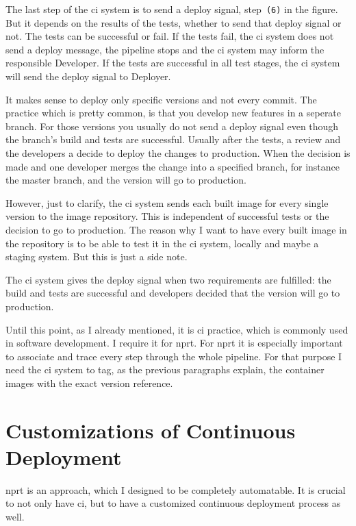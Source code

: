 The last step of the \gls{ci} system is to send a deploy signal, step~\texttt{(6)} in the
figure. But it depends on the results of the tests, whether to send that deploy signal or
not. The tests can be successful or fail. If the tests fail, the \gls{ci} system does not
send a deploy message, the pipeline stops and the \gls{ci} system may inform the
responsible Developer. If the tests are successful in all test stages, the \gls{ci} system
will send the deploy signal to Deployer.

It makes sense to deploy only specific versions and not every commit. The practice which
is pretty common, is that you develop new features in a seperate branch. For those
versions you usually do not send a deploy signal even though the branch's build and tests
are successful. Usually after the tests, a review and the developers a decide to deploy
the changes to production. When the decision is made and one developer merges the change
into a specified branch, for instance the master branch, and the version will go to
production.

However, just to clarify, the \gls{ci} system sends each built image for every single
version to the image repository. This is independent of successful tests or the decision
to go to production. The reason why I want to have every built image in the repository is
to be able to test it in the \gls{ci} system, locally and maybe a staging system. But this
is just a side note.

The \gls{ci} system gives the deploy signal when two requirements are fulfilled: the build
and tests are successful and developers decided that the version will go to production.

Until this point, as I already mentioned, it is \gls{ci} practice, which is commonly used
in software development. I require it for \gls{nprt}. For \gls{nprt} it is especially
important to associate and trace every step through the whole pipeline. For that purpose I
need the \gls{ci} system to tag, as the previous paragraphs explain, the container images
with the exact version reference.

\section{Customizations of Continuous Deployment}

\gls{nprt} is an approach, which I designed to be completely automatable. It is crucial to
not only have \gls{ci}, but to have a customized continuous deployment process as well.

